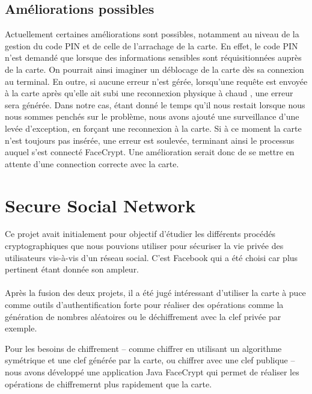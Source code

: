 \documentclass[a4paper,11pt,french]{article}
\begin{document}
\paragraph{}



\subsection{Améliorations possibles}
Actuellement certaines améliorations sont possibles, notamment au niveau
de la gestion du code PIN et de celle de l'arrachage de la carte. En effet,
le code PIN n'est demandé que lorsque des informations sensibles sont
réquisitionnées auprès de la carte. On pourrait ainsi imaginer un déblocage
de la carte dès sa connexion au terminal. En outre, si aucune erreur n'est gérée,
lorsqu'une requête est envoyée à la carte après qu'elle ait subi une reconnexion
physique \og à chaud \fg{}, une erreur sera générée. Dans notre cas, étant donné
le temps qu'il nous restait lorsque nous nous sommes penchés sur le problème, 
nous avons ajouté une surveillance d'une levée d'exception, en forçant une 
reconnexion à la carte. Si à ce moment la carte n'est toujours pas insérée,
une erreur est soulevée, terminant ainsi le processus auquel s'est connecté
FaceCrypt. Une amélioration serait donc de se mettre en attente d'une connection
correcte avec la carte.



\clearpage

\section{Secure Social Network}
Ce projet avait initialement pour objectif d'étudier les différents 
procédés cryptographiques que nous pouvions utiliser pour sécuriser la vie
privée des utilisateurs vis-à-vis d'un réseau social. C'est Facebook qui a 
été choisi car plus pertinent étant donnée son ampleur.

\paragraph{}
Après la fusion des deux projets, il a été jugé intéressant d'utiliser 
la carte à puce comme outils d'authentification forte pour réaliser des 
opérations comme la génération de nombres aléatoires ou le déchiffrement 
avec la clef privée par exemple.

Pour les besoins de chiffrement -- comme chiffrer en utilisant un algorithme
symétrique et une clef générée par la carte, ou chiffrer avec une clef
publique -- nous avons développé une application Java \og{}FaceCrypt \fg{}
qui permet de réaliser les opérations de chiffremernt plus rapidement que la
carte.
\end{document}

